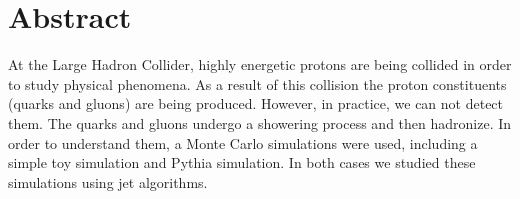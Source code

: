 
\chapter*{Abstract} 
At the Large Hadron Collider, highly energetic protons are being collided in order to study physical phenomena. As a result of this collision the proton constituents (quarks and gluons) are being produced.
However, in practice, we can not detect them.
The quarks and gluons undergo a showering process and then hadronize.
In order to understand them, a Monte Carlo simulations  were used, including a simple toy simulation and Pythia simulation. In both cases we studied these simulations using jet algorithms.

%
%
%
%




